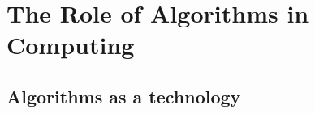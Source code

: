 \chapter{The Role of Algorithms in Computing}
\setcounter{section}{1}
\section{Algorithms as a technology}
\setcounter{subsection}{1}
\subsection{}

\subsection{}

